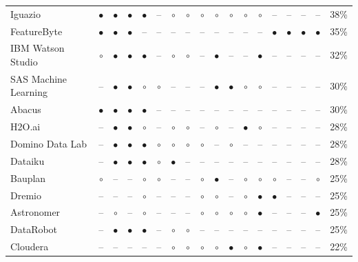 \begin{landscape}
\begin{table}[p]
{\begin{tabular}{l cccc cccc cccc cccc r}
Iguazio & $\bullet$ & $\bullet$ & $\bullet$ & $\bullet$ & -- & $\circ$ & $\circ$ & $\circ$ & $\circ$ & $\circ$ & $\circ$ & $\circ$ & -- & -- & -- & -- & 38\% \\
FeatureByte & $\bullet$ & $\bullet$ & $\bullet$ & -- & -- & -- & -- & -- & -- & -- & -- & -- & $\bullet$ & $\bullet$ & $\bullet$ & $\bullet$ & 35\% \\
IBM Watson Studio & $\circ$ & $\bullet$ & $\bullet$ & $\bullet$ & -- & $\circ$ & $\circ$ & -- & $\bullet$ & -- & -- & $\bullet$ & -- & -- & -- & -- & 32\% \\
SAS Machine Learning & -- & $\bullet$ & $\bullet$ & $\circ$ & $\circ$ & -- & -- & -- & $\bullet$ & $\bullet$ & $\circ$ & $\circ$ & -- & -- & -- & -- & 30\% \\
Abacus & $\bullet$ & $\bullet$ & $\bullet$ & $\bullet$ & -- & -- & -- & -- & -- & -- & -- & -- & -- & -- & -- & -- & 30\% \\
H2O.ai & -- & $\bullet$ & $\bullet$ & $\circ$ & -- & $\circ$ & $\circ$ & -- & $\circ$ & -- & $\bullet$ & $\circ$ & -- & -- & -- & -- & 28\% \\
Domino Data Lab & -- & $\bullet$ & $\bullet$ & $\bullet$ & $\circ$ & $\circ$ & $\circ$ & $\circ$ & -- & $\circ$ & -- & -- & -- & -- & -- & -- & 28\% \\
Dataiku & -- & $\bullet$ & $\bullet$ & $\bullet$ & $\circ$ & $\bullet$ & -- & -- & -- & -- & -- & -- & -- & -- & -- & -- & 28\% \\
Bauplan & $\circ$ & -- & -- & $\circ$ & $\circ$ & -- & -- & $\circ$ & $\bullet$ & -- & $\circ$ & $\circ$ & $\circ$ & -- & -- & $\circ$ & 25\% \\
Dremio & -- & -- & -- & $\circ$ & -- & -- & -- & $\circ$ & $\circ$ & -- & $\circ$ & $\bullet$ & $\bullet$ & -- & -- & -- & 25\% \\
Astronomer & -- & $\circ$ & -- & $\circ$ & -- & -- & -- & $\circ$ & $\circ$ & $\circ$ & $\circ$ & $\bullet$ & -- & -- & -- & $\bullet$ & 25\% \\
DataRobot & -- & $\bullet$ & $\bullet$ & $\bullet$ & -- & $\circ$ & $\circ$ & -- & -- & -- & -- & -- & -- & -- & -- & -- & 25\% \\
Cloudera & -- & -- & -- & -- & -- & $\circ$ & $\circ$ & $\circ$ & $\circ$ & $\bullet$ & $\circ$ & $\bullet$ & -- & -- & -- & -- & 22\% \\
\bottomrule
\end{tabular}}
\end{table}
\end{landscape}

